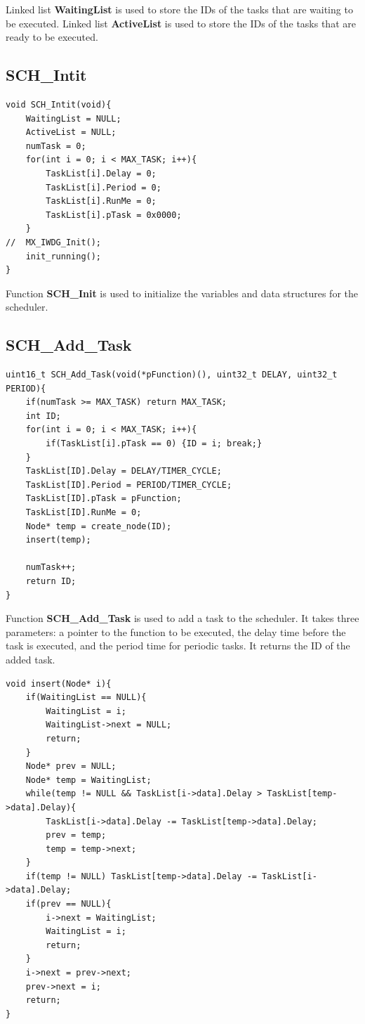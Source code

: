 \documentclass[twoside, final]{hcmut_report}
\begin{document}
Linked list \textbf{WaitingList} is used to store the IDs of the tasks that are waiting to be executed. Linked list \textbf{ActiveList} is used to store the IDs of the tasks that are ready to be executed.

\subsection{SCH\_Intit}

\begin{lstlisting}[basicstyle=\small, caption=An implementation of the ‘SCH\_Intit’ functions]
void SCH_Intit(void){
	WaitingList = NULL;
	ActiveList = NULL;
	numTask = 0;
	for(int i = 0; i < MAX_TASK; i++){
		TaskList[i].Delay = 0;
		TaskList[i].Period = 0;
		TaskList[i].RunMe = 0;
		TaskList[i].pTask = 0x0000;
	}
//	MX_IWDG_Init();
	init_running();
}
\end{lstlisting}

Function \textbf{SCH\_Init} is used to initialize the variables and data structures for the scheduler. 
\subsection{SCH\_Add\_Task}
\begin{lstlisting}[basicstyle=\small, caption=An implementation of the ‘SCH\_Add\_Task’ functions]
uint16_t SCH_Add_Task(void(*pFunction)(), uint32_t DELAY, uint32_t PERIOD){
	if(numTask >= MAX_TASK) return MAX_TASK;
	int ID;
	for(int i = 0; i < MAX_TASK; i++){
		if(TaskList[i].pTask == 0) {ID = i; break;}
	}
	TaskList[ID].Delay = DELAY/TIMER_CYCLE;
	TaskList[ID].Period = PERIOD/TIMER_CYCLE;
	TaskList[ID].pTask = pFunction;
	TaskList[ID].RunMe = 0;
	Node* temp = create_node(ID);
	insert(temp);

	numTask++;
	return ID;
}
\end{lstlisting}
Function \textbf{SCH\_Add\_Task} is used to add a task to the scheduler. It takes three parameters: a pointer to the function to be executed, the delay time before the task is executed, and the period time for periodic tasks. It returns the ID of the added task.

\begin{lstlisting}[basicstyle=\small, caption=An implementation of the ‘insert’ functions]
void insert(Node* i){
	if(WaitingList == NULL){
		WaitingList = i;
		WaitingList->next = NULL;
		return;
	}
	Node* prev = NULL;
	Node* temp = WaitingList;
	while(temp != NULL && TaskList[i->data].Delay > TaskList[temp->data].Delay){
		TaskList[i->data].Delay -= TaskList[temp->data].Delay;
		prev = temp;
		temp = temp->next;
	}
	if(temp != NULL) TaskList[temp->data].Delay -= TaskList[i->data].Delay;
	if(prev == NULL){
		i->next = WaitingList;
		WaitingList = i;
		return;
	}
	i->next = prev->next;
	prev->next = i;
	return;
}
\end{lstlisting}
\end{document}
